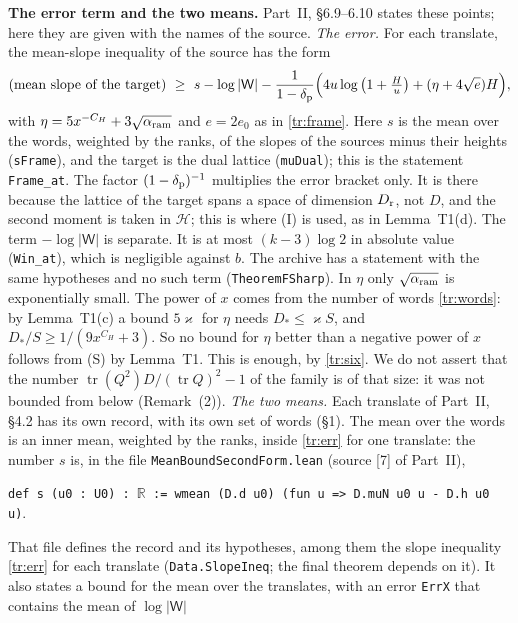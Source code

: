 \documentclass[11pt,letterpaper]{article}
\begin{document}
\textbf{The error term and the two means.} Part~II, \S6.9--6.10 states these points; here they are given
with the names of the source. \emph{The error.} For each translate, the mean-slope inequality of the source
has the form
\begin{equation}\label{tr:err}
 (\text{mean slope of the target})\ \ge\ s-\log|\mathsf W|
 -\frac1{1-\delta_{\rm p}}\Big(4u\log\big(1+\tfrac Hu\big)+(\eta+4\sqrt e)H\Big),
\end{equation}
with $\eta=5x^{-C_H}+3\sqrt{\alpha_{\rm ram}}$ and $e=2e_0$ as in \eqref{tr:frame}. Here $s$ is the mean over the words,
weighted by the ranks, of the slopes of the sources minus their heights (\texttt{sFrame}), and the target is
the dual lattice (\texttt{muDual}); this is the statement \texttt{Frame\_at}. The factor $(1-\delta_{\rm p})^{-1}$
multiplies the error bracket only. It is there because the lattice of the target spans a space of dimension
$D_{\rm r}$, not $D$, and the second moment is taken in $\mathcal H$; this is where (I) is used, as in
Lemma~T1(d). The term $-\log|\mathsf W|$ is separate. It is at most $(k-3)\log2$ in absolute value
(\texttt{Win\_at}), which is negligible against $b$. The archive has a statement with the same hypotheses and
no such term (\texttt{TheoremFSharp}). In $\eta$ only $\sqrt{\alpha_{\rm ram}}$ is exponentially small. The power of $x$
comes from the number of words \eqref{tr:words}: by Lemma~T1(c) a bound $5\varkappa$ for $\eta$ needs
$D_*\le\varkappa S$, and $D_*/S\ge1/(9x^{C_H}+3)$. So no bound for $\eta$ better than a negative power of $x$
follows from \textup{(S)} by Lemma~T1. This is enough, by \eqref{tr:six}. We do not assert that the number
$\operatorname{tr}(Q^2)D/(\operatorname{tr}Q)^2-1$ of the family is of that size: it was not bounded from
below (Remark~(2)). \emph{The two means.} Each translate of Part~II, \S4.2 has its own record, with its own
set of words (\S1). The mean over the words is an inner mean, weighted by the ranks, inside \eqref{tr:err}
for one translate: the number $s$ is, in the file \texttt{MeanBoundSecondForm.lean} (source [7] of Part~II),
\begin{center}\texttt{def s (u0 : U0) : }$\mathbb R$\texttt{ := wmean (D.d u0) (fun u => D.muN u0 u - D.h u0 u)}.\end{center} That file defines the
record and its hypotheses, among them the slope inequality \eqref{tr:err} for each translate
(\texttt{Data.SlopeIneq}; the final theorem depends on it). It also states a bound for the mean over the
translates, with an error \texttt{ErrX} that contains the mean of $\log|\mathsf W|$
\end{document}
